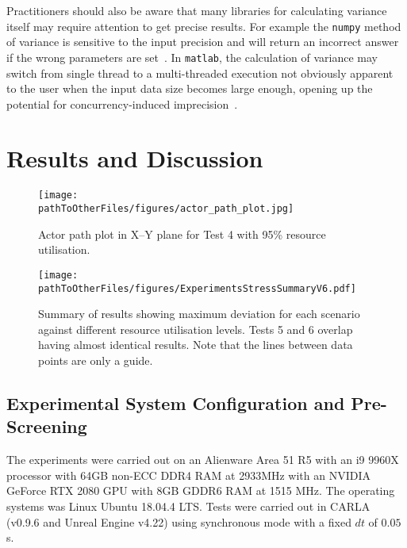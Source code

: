 Practitioners should also be aware that many libraries for calculating variance itself may require attention to get precise results. For example the \texttt{numpy} method of variance is sensitive to the input precision and will return an incorrect answer if the wrong parameters are set~\cite{NumpyVar}. In \texttt{matlab}, the calculation of variance may switch from single thread to a multi-threaded execution not obviously apparent to the user when the input data size becomes large enough, opening up the potential for concurrency-induced imprecision~\cite{matlab_parallel_computing}. 


\DIFaddbegin 

\DIFaddend \section{Results and Discussion}\label{s:FinalResultsSection}
\begin{figure}[t]
    \centering
    \texttt{[image: \\pathToOtherFiles/figures/actor\_path\_plot.jpg]}
    \caption{Actor path plot in X--Y plane for Test 4 with 95\% resource utilisation.}
    \label{actorPathPlot}
\end{figure}

\begin{figure}[t]
    \centering
    \texttt{[image: \\pathToOtherFiles/figures/ExperimentsStressSummaryV6.pdf]}
    \caption{Summary of results showing maximum deviation for each scenario against different resource utilisation levels. Tests 5 and 6 overlap having almost identical results. Note that the lines between data points are only a guide.}
    \label{ExperimentsStressSummary}
\end{figure}



\DIFaddbegin 

\DIFaddend \subsection{Experimental System Configuration and Pre-Screening}\label{s:screening}
The experiments were carried out on an Alienware Area 51 R5 with an i9 9960X processor with 64GB non-ECC DDR4 RAM at 2933MHz with an NVIDIA GeForce RTX 2080 GPU with 8GB GDDR6 RAM at 1515 MHz. The operating systems was Linux Ubuntu 18.04.4 LTS. Tests were carried out in CARLA (v0.9.6 and Unreal Engine v4.22) using synchronous mode with a fixed $dt$ of $0.05$s. 

